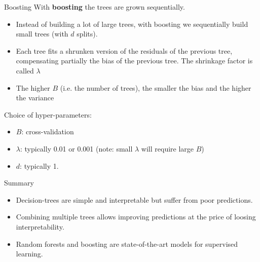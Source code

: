 \documentclass[notes]{beamer}          %
\begin{document}
\begin{frame}{Boosting}
With \textbf{boosting} the trees are grown sequentially.
\begin{itemize}
\item Instead of building a lot of large trees, with boosting we sequentially build small trees (with $d$ splits).
\item Each tree fits a shrunken version of the residuals of the previous tree, compensating partially the bias of the previous tree. The shrinkage factor is called $\lambda$
\item The higher $B$ (i.e. the number of trees), the smaller the bias and the higher the variance
\end{itemize}

Choice of hyper-parameters:

\begin{itemize}
\item $B$: cross-validation
\item $\lambda$: typically 0.01 or 0.001 (note: small $\lambda$ will require large $B$)
\item $d$: typically 1.
\end{itemize}


\end{frame}

\begin{frame}{Summary}
\begin{itemize}
\item Decision-trees are simple and interpretable but suffer from poor predictions.
\item Combining multiple trees allows improving predictions at the price of loosing interpretability.
\item Random forests and boosting are state-of-the-art models for supervised learning.
\end{itemize}
\end{frame}
\end{document}
